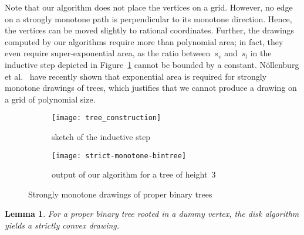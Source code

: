 \documentclass[a4paper,11pt]{article}
\theoremstyle{plain}
\newtheorem{lemma}{Lemma}
\begin{document}
Note that our algorithm does not place the vertices on a grid. However, 
no edge on a strongly monotone path is perpendicular to its monotone direction.
Hence, the vertices can be moved slightly to rational coordinates.
Further, the drawings computed by our algorithms require more than polynomial 
area; in fact, they even require super-exponential area, as the ratio 
between~$s_v$ and~$s_l$ in the inductive step depicted in 
Figure~\ref{fig:construction-ind} cannot be bounded by a constant.
N\"ollenburg et al.~\cite{npr-saicd-GD14} have recently shown that 
exponential area is required for strongly monotone drawings
of trees, which justifies that we cannot produce a drawing on a grid of
polynomial size.


\begin{figure}[tb]
  \begin{subfigure}[b]{.38\columnwidth}
    \centering
    \texttt{[image: tree\_construction]}
    \caption{sketch of the inductive step}
    \label{fig:construction-ind}
  \end{subfigure}
  \hfill
  \begin{subfigure}[b]{.58\columnwidth}
    \centering
    \texttt{[image: strict-monotone-bintree]}
    \caption{output of our algorithm for a tree of height~3}
    \label{fig:construction-final}
  \end{subfigure}
  \caption{Strongly monotone drawings of proper binary trees}
  \label{fig:construction}
\end{figure}

\begin{lemma}\label{lem:strict-conv-bintree-proof}
  For a proper binary tree rooted in a dummy vertex,
  the disk algorithm yields a strictly convex drawing.
\end{lemma}
\end{document}
